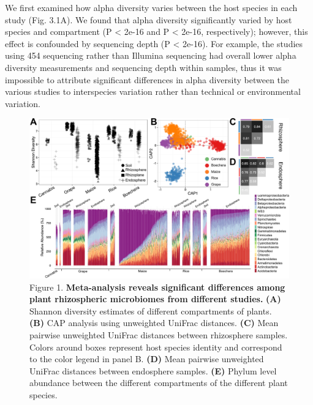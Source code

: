 We first examined how alpha diversity varies between the host species in each study (Fig. 3.1A). We found that alpha diversity significantly varied by host species and compartment (P < 2e-16 and P < 2e-16, respectively); however, this effect is confounded by sequencing depth (P < 2e-16). For example, the studies using 454 sequencing rather than Illumina sequencing had overall lower alpha diversity measurements and sequencing depth within samples, thus it was impossible to attribute significant differences in alpha diversity between the various studies to interspecies variation rather than technical or environmental variation. 

\begin{figure}[h]
\centering
\includegraphics[width=6in]{Figures/figure2_1}
\caption[Figure 3.1]{Figure 1. \textbf{Meta-analysis reveals significant differences among plant rhizospheric microbiomes from different studies.} \textbf{(A)} Shannon diversity estimates of different compartments of plants. \textbf{(B)} CAP analysis using unweighted UniFrac distances. \textbf{(C)} Mean pairwise unweighted UniFrac distances between rhizosphere samples. Colors around boxes represent host species identity and correspond to the color legend in panel B. \textbf{(D)} Mean pairwise unweighted UniFrac distances between endosphere samples. \textbf{(E)} Phylum level abundance between the different compartments of the different plant species.}
\label{fig.sample_1}
\end{figure}

